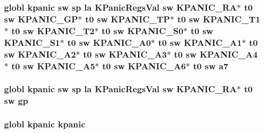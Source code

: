 \hypertarget{riscv_2kpanica_8S_ab001250eb5f7bbd2b6ee7161d92204b4}{
\subsubsection[{a7}]{\setlength{\rightskip}{0pt plus 5cm}globl {\bf kpanic} {\bf sw} {\bf sp} {\bf la} {\bf K\-Panic\-Regs\-Val} {\bf sw} {\bf K\-P\-A\-N\-I\-C\-\_\-\-R\-A}$\ast$ {\bf t0} {\bf sw} {\bf K\-P\-A\-N\-I\-C\-\_\-\-G\-P}$\ast$ {\bf t0} {\bf sw} {\bf K\-P\-A\-N\-I\-C\-\_\-\-T\-P}$\ast$ {\bf t0} {\bf sw} {\bf K\-P\-A\-N\-I\-C\-\_\-\-T1}$\ast$ {\bf t0} {\bf sw} {\bf K\-P\-A\-N\-I\-C\-\_\-\-T2}$\ast$ {\bf t0} {\bf sw} {\bf K\-P\-A\-N\-I\-C\-\_\-\-S0}$\ast$ {\bf t0} {\bf sw} {\bf K\-P\-A\-N\-I\-C\-\_\-\-S1}$\ast$ {\bf t0} {\bf sw} {\bf K\-P\-A\-N\-I\-C\-\_\-\-A0}$\ast$ {\bf t0} {\bf sw} {\bf K\-P\-A\-N\-I\-C\-\_\-\-A1}$\ast$ {\bf t0} {\bf sw} {\bf K\-P\-A\-N\-I\-C\-\_\-\-A2}$\ast$ {\bf t0} {\bf sw} {\bf K\-P\-A\-N\-I\-C\-\_\-\-A3}$\ast$ {\bf t0} {\bf sw} {\bf K\-P\-A\-N\-I\-C\-\_\-\-A4}$\ast$ {\bf t0} {\bf sw} {\bf K\-P\-A\-N\-I\-C\-\_\-\-A5}$\ast$ {\bf t0} {\bf sw} {\bf K\-P\-A\-N\-I\-C\-\_\-\-A6}$\ast$ {\bf t0} {\bf sw} a7}}\label{riscv_2kpanica_8S_ab001250eb5f7bbd2b6ee7161d92204b4}
\hypertarget{riscv_2kpanica_8S_a0e3f1049dc3871e519e9a3a213717ae7}{
\subsubsection[{gp}]{\setlength{\rightskip}{0pt plus 5cm}globl {\bf kpanic} {\bf sw} {\bf sp} {\bf la} {\bf K\-Panic\-Regs\-Val} {\bf sw} {\bf K\-P\-A\-N\-I\-C\-\_\-\-R\-A}$\ast$ {\bf t0} {\bf sw} gp}}\label{riscv_2kpanica_8S_a0e3f1049dc3871e519e9a3a213717ae7}
\hypertarget{riscv_2kpanica_8S_a7f530336b5f1563eee0a1052ea0d4a9b}{
\subsubsection[{kpanic}]{\setlength{\rightskip}{0pt plus 5cm}globl kpanic kpanic}}\label{riscv_2kpanica_8S_a7f530336b5f1563eee0a1052ea0d4a9b}
